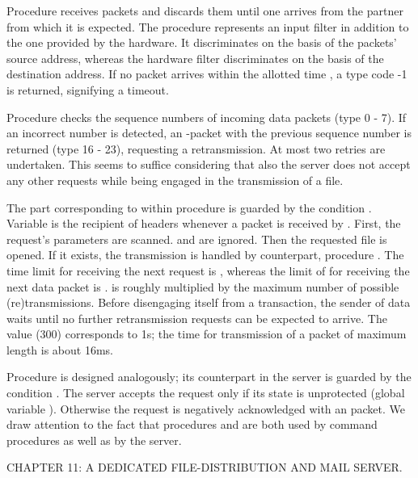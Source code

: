 Procedure  receives packets and discards them until one arrives from the partner from which it is expected. The procedure represents an input filter in addition to the one provided by the hardware. It discriminates on the basis of the packets' source address, whereas the hardware filter discriminates on the basis of the destination address. If no packet arrives within the allotted time , a type code -1 is returned, signifying a timeout.

Procedure  checks the sequence numbers of incoming data packets (type 0 - 7). If an incorrect number is detected, an -packet with the previous sequence number is returned (type 16 - 23), requesting a retransmission. At most two retries are undertaken. This seems to suffice considering that also the server does not accept any other requests while being engaged in the transmission of a file.

The part corresponding to  within procedure  is guarded by the condition  \equiv {}. Variable  is the recipient of headers whenever a packet is received by . First, the request's parameters are scanned.  and  are ignored. Then the requested file is opened. If it exists, the transmission is handled by  counterpart, procedure . The time limit for receiving the next request is , whereas the limit of  for receiving the next data packet is .  is roughly  multiplied by the maximum number of possible (re)transmissions. Before disengaging itself from a transaction, the sender of data waits until no further retransmission requests can be expected to arrive. The value  (300) corresponds to 1s; the time for transmission of a packet of maximum length is about 16ms.

Procedure  is designed analogously; its counterpart in the server is guarded by the condition  \equiv {}. The server accepts the request only if its state is unprotected (global variable ). Otherwise the request is negatively acknowledged with an  packet. We draw attention to the fact that procedures  and  are both used by command procedures as well as by the server.

\beginchapter CHAPTER 11: A DEDICATED FILE-DISTRIBUTION AND MAIL SERVER.

